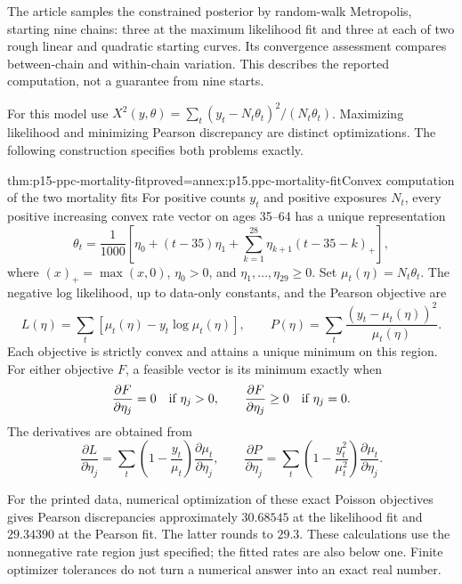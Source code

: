 The article samples the constrained posterior by random-walk Metropolis,
starting nine chains: three at the maximum likelihood fit and three at each
of two rough linear and quadratic starting curves. Its convergence assessment
compares between-chain and within-chain variation. This describes the
reported computation, not a guarantee from nine starts.

For this model use
\(X^2(y,\theta)=\sum_t(y_t-N_t\theta_t)^2/(N_t\theta_t)\).
Maximizing likelihood and minimizing Pearson discrepancy are distinct
optimizations. The following construction specifies both problems exactly.

\begin{hbtheorem}{thm:p15-ppc-mortality-fit}{proved=annex:p15.ppc-mortality-fit}{Convex computation of the two mortality fits}
For positive counts \(y_t\) and positive exposures \(N_t\), every
positive increasing convex rate vector on ages 35--64 has a unique
representation
\[
 \theta_t=\frac1{1000}\left[
 \eta_0+(t-35)\eta_1+
 \sum_{k=1}^{28}\eta_{k+1}(t-35-k)_+\right],
\]
where \((x)_+=\max(x,0)\), \(\eta_0>0\), and
\(\eta_1,\ldots,\eta_{29}\geq0\). Set
\(\mu_t(\eta)=N_t\theta_t\). The negative log likelihood, up to
data-only constants, and the Pearson objective are
\[
 L(\eta)=\sum_t[\mu_t(\eta)-y_t\log\mu_t(\eta)],\qquad
 P(\eta)=\sum_t\frac{(y_t-\mu_t(\eta))^2}{\mu_t(\eta)}.
\]
Each objective is strictly convex and attains a unique minimum on this
region. For either objective \(F\), a feasible vector is its minimum
exactly when
\[
 \frac{\partial F}{\partial\eta_j}=0\quad\hbox{if }\eta_j>0,
 \qquad
 \frac{\partial F}{\partial\eta_j}\geq0\quad\hbox{if }\eta_j=0.
\]
The derivatives are obtained from
\[
 \frac{\partial L}{\partial\eta_j}
 =\sum_t\left(1-\frac{y_t}{\mu_t}\right)
                   \frac{\partial\mu_t}{\partial\eta_j},\qquad
 \frac{\partial P}{\partial\eta_j}
 =\sum_t\left(1-\frac{y_t^2}{\mu_t^2}\right)
                   \frac{\partial\mu_t}{\partial\eta_j}.
\]
\end{hbtheorem}

For the printed data, numerical optimization of these exact Poisson
objectives gives Pearson discrepancies approximately \(30.68545\) at
the likelihood fit and \(29.34390\) at the Pearson fit. The latter
rounds to \(29.3\). These calculations use the nonnegative rate region
just specified; the fitted rates are also below one. Finite optimizer
tolerances do not turn a numerical answer into an exact real number.

